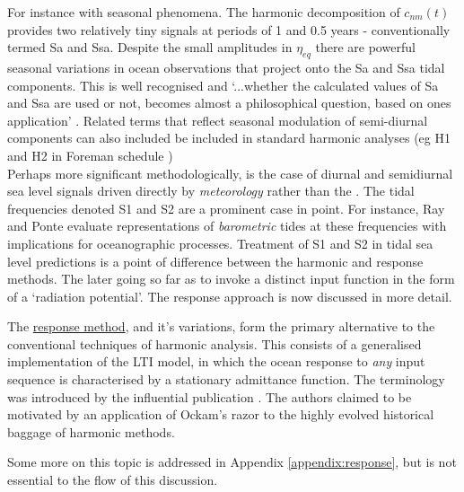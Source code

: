 For instance with seasonal phenomena.   The harmonic decomposition of $c_{nm}(t)$ provides two relatively tiny signals at periods of 1 and 0.5 years - conventionally termed Sa and Ssa.  Despite the small amplitudes in $\eta_{eq}$ there are powerful seasonal variations in ocean observations that project onto the Sa and Ssa tidal components.   This is well recognised and `...whether the calculated values of Sa and Ssa are used or not, becomes almost a philosophical question, based on ones application' \citep[p122]{Parker:2007wq}.   Related terms that reflect seasonal modulation of semi-diurnal components can also included be included in standard harmonic analyses (eg H1 and H2 in Foreman schedule \citep{Foreman:1977ua})\\
Perhaps more significant methodologically, is the case of diurnal and semidiurnal sea level signals driven directly by \emph{meteorology} rather than the \ATGP{}.   The tidal frequencies denoted S1 and S2 are a prominent case in point.  For instance, Ray and Ponte \citep{Ray:2003ui} evaluate \NWP{} representations of \emph{barometric} tides at these frequencies with implications for oceanographic processes.  Treatment of S1 and S2 in tidal sea level predictions is a point of difference between the harmonic and response methods.  The later going so far as to invoke a distinct input function in the form of a `radiation potential'.    The response approach is now discussed in more detail. 




The \underline{response method}, and it's variations, form the primary alternative to the conventional techniques of harmonic analysis.   This consists of a generalised implementation of the LTI model, in which the ocean response to \emph{any} input sequence is characterised by a stationary admittance function.  The terminology was introduced by the influential publication \citet{Munk:1966ts}.
The authors claimed to be motivated by an application of Ockam's razor to the highly evolved historical baggage of harmonic methods.   

Some more on this topic is addressed in Appendix \ref{appendix:response}, but is not essential to the flow of this discussion.



